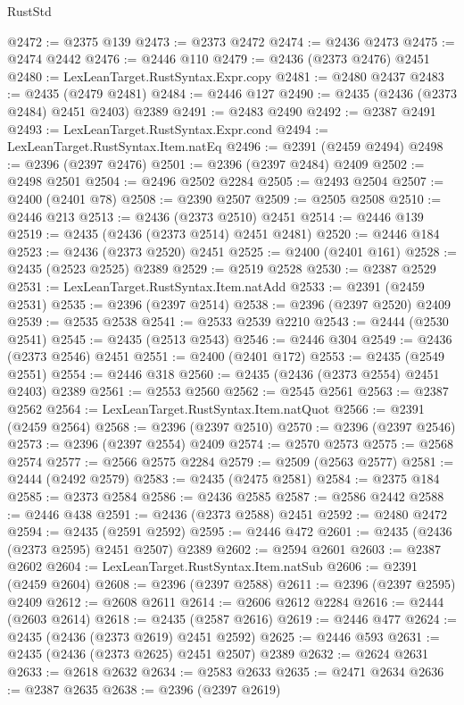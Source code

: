 \begin{lexlean}{RustStd}
\begin{coremodule}
@2472 := @2375 @139
@2473 := @2373 @2472
@2474 := @2436 @2473
@2475 := @2474 @2442
@2476 := @2446 @110
@2479 := @2436 (@2373 @2476) @2451
@2480 := LexLeanTarget.RustSyntax.Expr.copy
@2481 := @2480 @2437
@2483 := @2435 (@2479 @2481)
@2484 := @2446 @127
@2490 := @2435 (@2436 (@2373 @2484) @2451 @2403) @2389
@2491 := @2483 @2490
@2492 := @2387 @2491
@2493 := LexLeanTarget.RustSyntax.Expr.cond
@2494 := LexLeanTarget.RustSyntax.Item.natEq
@2496 := @2391 (@2459 @2494)
@2498 := @2396 (@2397 @2476)
@2501 := @2396 (@2397 @2484) @2409
@2502 := @2498 @2501
@2504 := @2496 @2502 @2284
@2505 := @2493 @2504
@2507 := @2400 (@2401 @78)
@2508 := @2390 @2507
@2509 := @2505 @2508
@2510 := @2446 @213
@2513 := @2436 (@2373 @2510) @2451
@2514 := @2446 @139
@2519 := @2435 (@2436 (@2373 @2514) @2451 @2481)
@2520 := @2446 @184
@2523 := @2436 (@2373 @2520) @2451
@2525 := @2400 (@2401 @161)
@2528 := @2435 (@2523 @2525) @2389
@2529 := @2519 @2528
@2530 := @2387 @2529
@2531 := LexLeanTarget.RustSyntax.Item.natAdd
@2533 := @2391 (@2459 @2531)
@2535 := @2396 (@2397 @2514)
@2538 := @2396 (@2397 @2520) @2409
@2539 := @2535 @2538
@2541 := @2533 @2539 @2210
@2543 := @2444 (@2530 @2541)
@2545 := @2435 (@2513 @2543)
@2546 := @2446 @304
@2549 := @2436 (@2373 @2546) @2451
@2551 := @2400 (@2401 @172)
@2553 := @2435 (@2549 @2551)
@2554 := @2446 @318
@2560 := @2435 (@2436 (@2373 @2554) @2451 @2403) @2389
@2561 := @2553 @2560
@2562 := @2545 @2561
@2563 := @2387 @2562
@2564 := LexLeanTarget.RustSyntax.Item.natQuot
@2566 := @2391 (@2459 @2564)
@2568 := @2396 (@2397 @2510)
@2570 := @2396 (@2397 @2546)
@2573 := @2396 (@2397 @2554) @2409
@2574 := @2570 @2573
@2575 := @2568 @2574
@2577 := @2566 @2575 @2284
@2579 := @2509 (@2563 @2577)
@2581 := @2444 (@2492 @2579)
@2583 := @2435 (@2475 @2581)
@2584 := @2375 @184
@2585 := @2373 @2584
@2586 := @2436 @2585
@2587 := @2586 @2442
@2588 := @2446 @438
@2591 := @2436 (@2373 @2588) @2451
@2592 := @2480 @2472
@2594 := @2435 (@2591 @2592)
@2595 := @2446 @472
@2601 := @2435 (@2436 (@2373 @2595) @2451 @2507) @2389
@2602 := @2594 @2601
@2603 := @2387 @2602
@2604 := LexLeanTarget.RustSyntax.Item.natSub
@2606 := @2391 (@2459 @2604)
@2608 := @2396 (@2397 @2588)
@2611 := @2396 (@2397 @2595) @2409
@2612 := @2608 @2611
@2614 := @2606 @2612 @2284
@2616 := @2444 (@2603 @2614)
@2618 := @2435 (@2587 @2616)
@2619 := @2446 @477
@2624 := @2435 (@2436 (@2373 @2619) @2451 @2592)
@2625 := @2446 @593
@2631 := @2435 (@2436 (@2373 @2625) @2451 @2507) @2389
@2632 := @2624 @2631
@2633 := @2618 @2632
@2634 := @2583 @2633
@2635 := @2471 @2634
@2636 := @2387 @2635
@2638 := @2396 (@2397 @2619)

\end{coremodule}
\end{lexlean}

